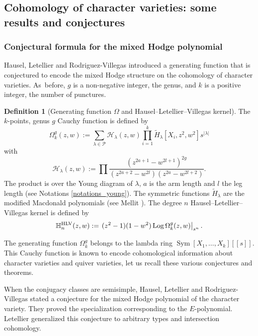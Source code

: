 \documentclass[JEP,XML,SOM,NoEqCountersInSection,Unicode,published]{cedram}
\newcommand{\HLV}{\textup{HLV}}
\theoremstyle{definition}
\newtheorem{definition}{Definition}[section]
\theoremstyle{plain}
\DeclareMathOperator{\SymF}{Sym}
\DeclareMathOperator{\Log}{Log}
\newcommand{\Part}{\mathcal{P}}
\newcommand{\Ht}{\tilde{H}}
\begin{document}
\subsection{Cohomology of character varieties: some results and conjectures}\label{sect_cohomology_char}
\subsubsection{Conjectural formula for the mixed Hodge polynomial}
Hausel, Letellier and Rodriguez-Villegas \cite{Hausel_Letellier_Villegas} introduced a generating function that is conjectured to encode the mixed Hodge structure on the cohomology of character varieties. As~before, $g$ is a non-negative integer, the genus, and $k$ is a positive integer, the number of punctures.
\begin{definition}[Generating function $\Omega$ and Hausel--Letellier--Villegas kernel]\label{def_omega_hlv}
The $k$-points, genus $g$ Cauchy function is defined by
\begin{equation}
\Omega^g_k(z,w):=\sum_{\lambda\in\Part}\mathcal{H}_\lambda(z,w)\prod_{i=1}^k\Ht_\lambda\left[X_i,z^2,w^2\right]s^{|\lambda|}
\end{equation}
with
\begin{equation}
\mathcal{H}_\lambda(z,w):=\prod\frac{\left(z^{2a+1}-w^{2l+1}\right)^{2g}}{\left(z^{2a+2}-w^{2l}\right)\left(z^{2a}-w^{2l+2}\right)}.
\end{equation}
The product is over the Young diagram of $\lambda$, $a$ is the arm length and $l$ the leg length (see Notations \ref{notations_young}). The symmetric functions
$\widetilde{H}_{\lambda}$ are the modified Macdonald polynomials (see Mellit \cite[Def.\,2.5]{Mellit2020}).
The degree $n$ Hausel--Letellier--Villegas kernel is defined by
\[
\mathbb{H}^{\HLV}_n(z,w):=\left.(z^2-1)(1-w^2) \Log \Omega_k^g(z,w)\right|_{s^n}.
\]
\end{definition}
The generating function $\Omega_k^g$ belongs to the lambda ring $\SymF[X_1,\dots,X_k][\![s]\!]$. This Cauchy function is known to encode cohomological information about character varie\-ties and quiver varieties, let us recall these various conjectures and theorems.

\begin{sloppypar}
When the conjugacy classes are semisimple, Hausel, Letellier and Rodriguez-Villegas \cite{Hausel_Letellier_Villegas} stated a conjecture for the mixed Hodge polynomial of the character variety. They proved the specialization corresponding to the $E$-polynomial. Letellier generalized this conjecture to arbitrary types and intersection cohomology.
\end{sloppypar}
\end{document}

